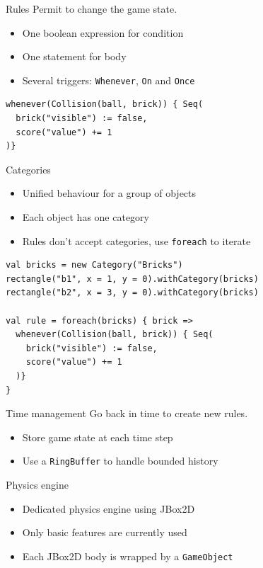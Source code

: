 \documentclass[12pt]{beamer}
\begin{document}
\begin{frame}[fragile]{Rules}
Permit to change the game state.
\begin{itemize}
\item One boolean expression for condition
\item One statement for body
\item Several triggers: \texttt{Whenever}, \texttt{On} and \texttt{Once}
\end{itemize}

\vspace*{5mm}

\begin{lstlisting}
whenever(Collision(ball, brick)) { Seq(
  brick("visible") := false, 
  score("value") += 1
)}
\end{lstlisting}
\end{frame}

\begin{frame}[fragile]{Categories}

\begin{itemize}
\item Unified behaviour for a group of objects
\item Each object has one category
\item Rules don't accept categories, use \texttt{foreach} to iterate
\end{itemize}

\begin{lstlisting}
val bricks = new Category("Bricks")
rectangle("b1", x = 1, y = 0).withCategory(bricks)
rectangle("b2", x = 3, y = 0).withCategory(bricks)

val rule = foreach(bricks) { brick =>
  whenever(Collision(ball, brick)) { Seq(
    brick("visible") := false,
    score("value") += 1
  )}
}
\end{lstlisting}
\end{frame}

\begin{frame}{Time management}
Go back in time to create new rules.
\begin{itemize}
\item Store game state at each time step
\item Use a \texttt{RingBuffer} to handle bounded history
\end{itemize}
\end{frame}

\begin{frame}{Physics engine}
\begin{itemize}
\item Dedicated physics engine using JBox2D
\item Only basic features are currently used
\item Each JBox2D body is wrapped by a \texttt{GameObject}
\end{itemize}
\end{frame}
\end{document}
